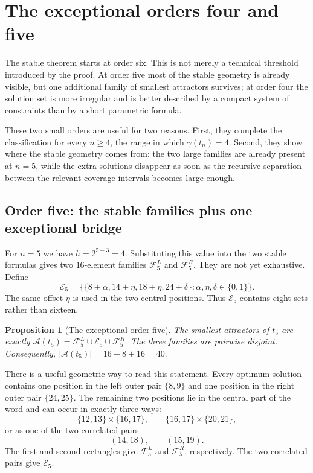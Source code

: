 \documentclass[11pt,a4paper]{article}
\newtheorem{proposition}[theorem]{Proposition}
\theoremstyle{definition}\newtheorem{definition}[theorem]{Definition}
\theoremstyle{remark}\newtheorem{remark}[theorem]{Remark}
\newcommand{\Acal}{\mathcal{A}}
\newcommand{\FL}{\mathcal{F}^{L}}
\newcommand{\FR}{\mathcal{F}^{R}}
\begin{document}
\section{The exceptional orders four and five}
\label{sec:exceptional-orders}

The stable theorem starts at order six.  This is not merely a technical threshold introduced by the proof.  At order five most of the stable geometry is already visible, but one additional family of smallest attractors survives; at order four the solution set is more irregular and is better described by a compact system of constraints than by a short parametric formula.

These two small orders are useful for two reasons.  First, they complete the classification for every $n\ge4$, the range in which $\gamma(t_n)=4$.  Second, they show where the stable geometry comes from: the two large families are already present at $n=5$, while the extra solutions disappear as soon as the recursive separation between the relevant coverage intervals becomes large enough.

\subsection{Order five: the stable families plus one exceptional bridge}
\label{subsec:t5-exceptional}

For $n=5$ we have $h=2^{5-3}=4$.  Substituting this value into the two stable formulas gives two $16$-element families $\FL_5$ and $\FR_5$.  They are not yet exhaustive.  Define
\[
 \mathcal E_5=
 \bigl\{\{8+\alpha,14+\eta,18+\eta,24+\delta\}:
       \alpha,\eta,\delta\in\{0,1\}\bigr\}.
\]
The same offset $\eta$ is used in the two central positions.  Thus $\mathcal E_5$ contains eight sets rather than sixteen.

\begin{proposition}[The exceptional order five]
\label{prop:t5-extended}
The smallest attractors of $t_5$ are exactly
$
 \Acal(t_5)=\FL_5\cup\mathcal E_5\cup\FR_5.
$
The three families are pairwise disjoint.  Consequently,
$
 |\Acal(t_5)|=16+8+16=40.
$
\end{proposition}

There is a useful geometric way to read this statement.  Every optimum solution contains one position in the left outer pair
$
 \{8,9\}
$
and one position in the right outer pair
$
 \{24,25\}.
$
The remaining two positions lie in the central part of the word and can occur in exactly three ways:
\[
 \{12,13\}\times\{16,17\},
 \qquad
 \{16,17\}\times\{20,21\},
\]
or as one of the two correlated pairs
\[
 (14,18),\qquad(15,19).
\]
The first and second rectangles give $\FL_5$ and $\FR_5$, respectively.  The two correlated pairs give $\mathcal E_5$.
\end{document}
